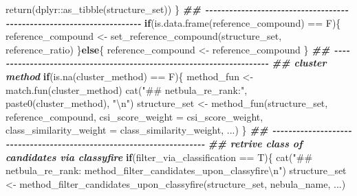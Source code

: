 \documentclass[
]{article}
\newenvironment{Shaded}{\begin{snugshade}}{\end{snugshade}}
\newcommand{\AttributeTok}[1]{\textcolor[rgb]{0.77,0.63,0.00}{#1}}
\newcommand{\ControlFlowTok}[1]{\textcolor[rgb]{0.13,0.29,0.53}{\textbf{#1}}}
\newcommand{\DocumentationTok}[1]{\textcolor[rgb]{0.56,0.35,0.01}{\textbf{\textit{#1}}}}
\newcommand{\FunctionTok}[1]{\textcolor[rgb]{0.00,0.00,0.00}{#1}}
\newcommand{\NormalTok}[1]{#1}
\newcommand{\OtherTok}[1]{\textcolor[rgb]{0.56,0.35,0.01}{#1}}
\newcommand{\SpecialCharTok}[1]{\textcolor[rgb]{0.00,0.00,0.00}{#1}}
\newcommand{\StringTok}[1]{\textcolor[rgb]{0.31,0.60,0.02}{#1}}
\begin{document}
\begin{Shaded}
\begin{Highlighting}[]
      \FunctionTok{return}\NormalTok{(dplyr}\SpecialCharTok{::}\FunctionTok{as\_tibble}\NormalTok{(structure\_set))}
\NormalTok{    \}}
    \DocumentationTok{\#\# {-}{-}{-}{-}{-}{-}{-}{-}{-}{-}{-}{-}{-}{-}{-}{-}{-}{-}{-}{-}{-}{-}{-}{-}{-}{-}{-}{-}{-}{-}{-}{-}{-}{-}{-}{-}{-}{-}{-}{-}{-}{-}{-}{-}{-}{-}{-}{-}{-}{-}{-}{-}{-}{-}{-}{-}{-}{-}{-}{-}{-}{-}{-}{-}{-}{-}{-}{-}{-}{-} }
    \ControlFlowTok{if}\NormalTok{(}\FunctionTok{is.data.frame}\NormalTok{(reference\_compound) }\SpecialCharTok{==}\NormalTok{ F)\{}
\NormalTok{      reference\_compound }\OtherTok{\textless{}{-}} \FunctionTok{set\_reference\_compound}\NormalTok{(structure\_set, reference\_ratio)}
\NormalTok{    \}}\ControlFlowTok{else}\NormalTok{\{}
\NormalTok{      reference\_compound }\OtherTok{\textless{}{-}}\NormalTok{ reference\_compound}
\NormalTok{    \}}
    \DocumentationTok{\#\# {-}{-}{-}{-}{-}{-}{-}{-}{-}{-}{-}{-}{-}{-}{-}{-}{-}{-}{-}{-}{-}{-}{-}{-}{-}{-}{-}{-}{-}{-}{-}{-}{-}{-}{-}{-}{-}{-}{-}{-}{-}{-}{-}{-}{-}{-}{-}{-}{-}{-}{-}{-}{-}{-}{-}{-}{-}{-}{-}{-}{-}{-}{-}{-}{-}{-}{-}{-}{-}{-} }
    \DocumentationTok{\#\# cluster method}
    \ControlFlowTok{if}\NormalTok{(}\FunctionTok{is.na}\NormalTok{(cluster\_method) }\SpecialCharTok{==}\NormalTok{ F)\{}
\NormalTok{      method\_fun }\OtherTok{\textless{}{-}} \FunctionTok{match.fun}\NormalTok{(cluster\_method)}
      \FunctionTok{cat}\NormalTok{(}\StringTok{"\#\# netbula\_re\_rank:"}\NormalTok{, }\FunctionTok{paste0}\NormalTok{(cluster\_method), }\StringTok{"}\SpecialCharTok{\textbackslash{}n}\StringTok{"}\NormalTok{)}
\NormalTok{      structure\_set }\OtherTok{\textless{}{-}} \FunctionTok{method\_fun}\NormalTok{(structure\_set, reference\_compound, }\AttributeTok{csi\_score\_weight =}\NormalTok{ csi\_score\_weight,}
                                  \AttributeTok{class\_similarity\_weight =}\NormalTok{ class\_similarity\_weight,}
\NormalTok{                                  ...)}
\NormalTok{    \}}
    \DocumentationTok{\#\# {-}{-}{-}{-}{-}{-}{-}{-}{-}{-}{-}{-}{-}{-}{-}{-}{-}{-}{-}{-}{-}{-}{-}{-}{-}{-}{-}{-}{-}{-}{-}{-}{-}{-}{-}{-}{-}{-}{-}{-}{-}{-}{-}{-}{-}{-}{-}{-}{-}{-}{-}{-}{-}{-}{-}{-}{-}{-}{-}{-}{-}{-}{-}{-}{-}{-}{-}{-}{-}{-} }
    \DocumentationTok{\#\# retrive class of candidates via classyfire}
    \ControlFlowTok{if}\NormalTok{(filter\_via\_classification }\SpecialCharTok{==}\NormalTok{ T)\{}
      \FunctionTok{cat}\NormalTok{(}\StringTok{"\#\# netbula\_re\_rank: method\_filter\_candidates\_upon\_classyfire}\SpecialCharTok{\textbackslash{}n}\StringTok{"}\NormalTok{)}
\NormalTok{      structure\_set }\OtherTok{\textless{}{-}} \FunctionTok{method\_filter\_candidates\_upon\_classyfire}\NormalTok{(structure\_set, nebula\_name, ...)}

\end{Highlighting}
\end{Shaded}
\end{document}
